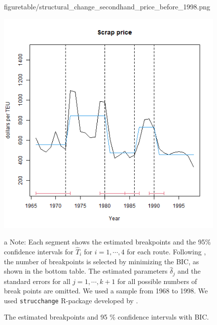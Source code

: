 \documentclass[11pt]{article}
\begin{document}
\begin{figure}[!ht]
\begin{minipage}[b]{0.3\linewidth}
  {figuretable/structural_change_secondhand_price_before_1998.png}
  \end{minipage}
  \begin{minipage}[b]{0.3\linewidth}
  \includegraphics[keepaspectratio, scale=0.31]
  {figuretable/structural_change_scrap_price_before_1998.png}
  \end{minipage}
  {\scriptsize{}
  
\caption{The estimated breakpoints and 95 \% confidence intervals with BIC.}
\label{fg:structural_change_scrap_price_before_1998}
\begin{tablenotes}
\item[a]Note: Each segment shows the estimated breakpoints and the 95\% confidence intervals for $\hat{T}_i$ for $i=1,\cdots,4$ for each route. Following \cite{bai2003computation}, the number of breakpoints is selected by minimizing the BIC, as shown in the bottom table. The estimated parameters $\hat{\delta}_j$ and the standard errors for all $j=1,\cdots,k+1$ for all possible numbers of break points are omitted. We used a sample from 1968 to 1998. We used \texttt{strucchange} R-package developed by \cite{zeileis2002strucchange}. 
   \end{tablenotes}
   }
\end{figure}
\end{document}
